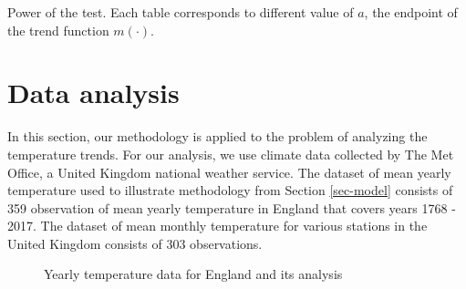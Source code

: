 \begin{center}
Power of the test. Each table corresponds to different value of $a$, the endpoint of the trend function $m(\cdot)$.\\
\begin{minipage}{.45\textwidth}
\begin{table}[H]
    \begin{center}
        \caption{$a = 0.25$}
        \label{tab:power_025_ll}
        \centering
        
    \end{center}
\end{table}

\end{minipage}
\begin{minipage}{.45\textwidth}

\begin{table}[H]
    \begin{center}
        \caption{$a = 0.50$}
        \label{tab:power_050_ll}
        \centering
        
    \end{center}
\end{table}
\end{minipage}


\begin{minipage}{.45\textwidth}
\begin{table}[H]
    \begin{center}
        \caption{$a = 0.65$}
        \label{tab:power_065_ll}
        \centering
        
    \end{center}
\end{table}
\end{minipage}
\begin{minipage}{.45\textwidth}
\begin{table}[H]
    \begin{center}
        \caption{$a = 0.75$}
        \label{tab:power_075_ll}
        \centering
        
    \end{center}
\end{table}
\end{minipage}

\end{center}


\newpage
\section{Data analysis}\label{sec-data}
In this section, our methodology is applied to the problem of analyzing the temperature trends. For our analysis, we use climate data collected by The Met Office, a United Kingdom national weather service. The dataset of mean yearly temperature used to illustrate methodology from Section \ref{sec-model} consists of 359 observation of mean yearly temperature in England that covers years 1768 - 2017. The dataset of mean monthly temperature for various stations in the United Kingdom consists of 303 observations. 

\begin{figure}[ht!]
\centering

\caption{Yearly temperature data for England and its analysis\label{data_analysis}}
\end{figure}

